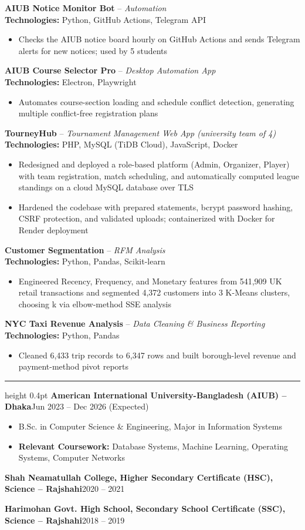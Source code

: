 \documentclass[10pt,letterpaper]{article}
\newcommand{\sect}[1]{\par\vspace{6pt}{\large\bfseries #1}\par\vspace{1pt}\hrule height 0.4pt\vspace{3pt}}
\newcommand{\project}[2]{\textbf{#1} -- \textit{#2}\\}
\newcommand{\tech}[1]{\textbf{Technologies:} #1\par\vspace{-1pt}}
\newcommand{\entry}[2]{\textbf{#1}\hfill #2\par}
\begin{document}
\project{AIUB Notice Monitor Bot}{Automation}
\tech{Python, GitHub Actions, Telegram API}
\begin{itemize}
  \item Checks the AIUB notice board hourly on GitHub Actions and sends Telegram alerts for new notices; used by 5 students
\end{itemize}

\project{AIUB Course Selector Pro}{Desktop Automation App}
\tech{Electron, Playwright}
\begin{itemize}
  \item Automates course-section loading and schedule conflict detection, generating multiple conflict-free registration plans
\end{itemize}

\project{TourneyHub}{Tournament Management Web App (university team of 4)}
\tech{PHP, MySQL (TiDB Cloud), JavaScript, Docker}
\begin{itemize}
  \item Redesigned and deployed a role-based platform (Admin, Organizer, Player) with team registration, match scheduling, and automatically computed league standings on a cloud MySQL database over TLS
  \item Hardened the codebase with prepared statements, bcrypt password hashing, CSRF protection, and validated uploads; containerized with Docker for Render deployment
\end{itemize}

\project{Customer Segmentation}{RFM Analysis}
\tech{Python, Pandas, Scikit-learn}
\begin{itemize}
  \item Engineered Recency, Frequency, and Monetary features from 541,909 UK retail transactions and segmented 4,372 customers into 3 K-Means clusters, choosing k via elbow-method SSE analysis
\end{itemize}

\project{NYC Taxi Revenue Analysis}{Data Cleaning \& Business Reporting}
\tech{Python, Pandas}
\begin{itemize}
  \item Cleaned 6,433 trip records to 6,347 rows and built borough-level revenue and payment-method pivot reports
\end{itemize}

\sect{EDUCATION}
\entry{American International University-Bangladesh (AIUB) -- Dhaka}{Jun 2023 -- Dec 2026 (Expected)}
\begin{itemize}
  \item B.Sc. in Computer Science \& Engineering, Major in Information Systems
  \item \textbf{Relevant Coursework:} Database Systems, Machine Learning, Operating Systems, Computer Networks
\end{itemize}
\vspace{2pt}
\entry{Shah Neamatullah College, \textnormal{Higher Secondary Certificate (HSC), Science -- Rajshahi}}{2020 -- 2021}
\entry{Harimohan Govt. High School, \textnormal{Secondary School Certificate (SSC), Science -- Rajshahi}}{2018 -- 2019}
\end{document}

